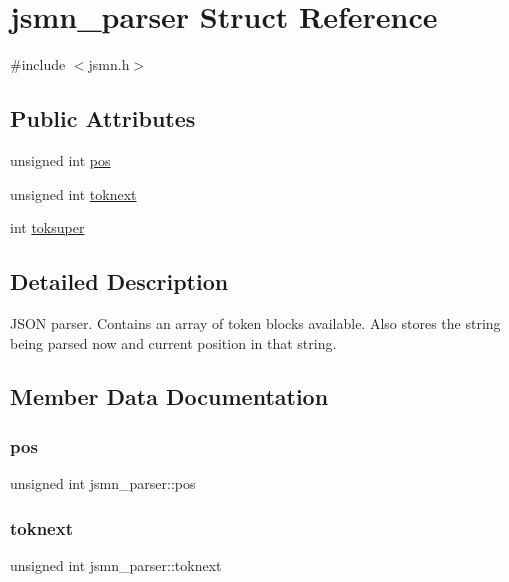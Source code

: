 \hypertarget{structjsmn__parser}{}\section{jsmn\+\_\+parser Struct Reference}
\label{structjsmn__parser}


{\ttfamily \#include $<$jsmn.\+h$>$}

\subsection*{Public Attributes}
\begin{DoxyCompactItemize}
\item 
unsigned int \hyperlink{structjsmn__parser_a3d0d6e48d3d5b24262f9e0c2241dc456}{pos}
\item 
unsigned int \hyperlink{structjsmn__parser_af640efd7d154218124a964b65f114bff}{toknext}
\item 
int \hyperlink{structjsmn__parser_af11fcec48d9f1298909777a12f1d1e39}{toksuper}
\end{DoxyCompactItemize}


\subsection{Detailed Description}
J\+S\+ON parser. Contains an array of token blocks available. Also stores the string being parsed now and current position in that string. 

\subsection{Member Data Documentation}
\mbox{\label{structjsmn__parser_a3d0d6e48d3d5b24262f9e0c2241dc456}} 
\subsubsection{\texorpdfstring{pos}{pos}}
{\footnotesize\ttfamily unsigned int jsmn\+\_\+parser\+::pos}

\mbox{\label{structjsmn__parser_af640efd7d154218124a964b65f114bff}} 
\subsubsection{\texorpdfstring{toknext}{toknext}}
{\footnotesize\ttfamily unsigned int jsmn\+\_\+parser\+::toknext}

